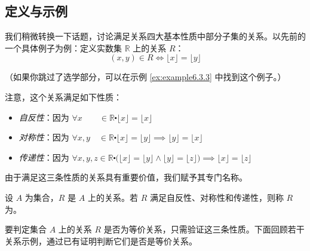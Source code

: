 
\subsection{定义与示例}

我们稍微转换一下话题，讨论满足关系四大基本性质中部分子集的关系。以先前的一个具体例子为例：定义实数集 $\mathbb{R}$ 上的关系 $R$：
\[(x, y) \in R \iff \lfloor x \rfloor = \lfloor y \rfloor\]

（如果你跳过了选学部分，可以在示例 \ref{ex:example6.3.3} 中找到这个例子。）

注意，这个关系满足如下性质：
\begin{itemize}
    \item \emph{自反性}：因为 $\forall x \qquad \in \mathbb{R} \centerdot \lfloor x \rfloor = \lfloor x \rfloor$
    \item \emph{对称性}：因为 $\forall x, y \quad \in \mathbb{R} \centerdot \lfloor x \rfloor = \lfloor y \rfloor \implies \lfloor y \rfloor = \lfloor x \rfloor$
    \item \emph{传递性}：因为 $\forall x, y, z \in \mathbb{R} \centerdot \big(\lfloor x \rfloor = \lfloor y \rfloor \land \lfloor y \rfloor = \lfloor z \rfloor \big) \implies \lfloor x \rfloor = \lfloor z \rfloor$
\end{itemize}

由于满足这三条性质的关系具有重要价值，我们赋予其专门名称。

\begin{definition}
    设 $A$ 为集合，$R$ 是 $A$ 上的关系。若 $R$ 满足自反性、对称性和传递性，则称 $R$ 为。
\end{definition}

要判定集合 $A$ 上的关系 $R$ 是否为等价关系，只需验证这三条性质。下面回顾若干关系示例，通过已有证明判断它们是否是等价关系。

